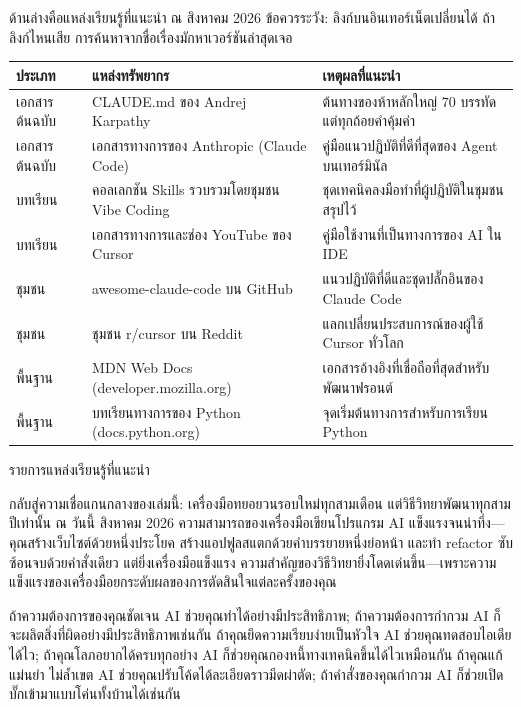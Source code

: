 
ด้านล่างคือแหล่งเรียนรู้ที่แนะนำ ณ สิงหาคม 2026 ข้อควรระวัง: ลิงก์บนอินเทอร์เน็ตเปลี่ยนได้ ถ้าลิงก์ไหนเสีย การค้นหาจากชื่อเรื่องมักหาเวอร์ชันล่าสุดเจอ

\begin{center}
\begin{tabularx}{\linewidth}{|X|X|X|}
\hline
\textbf{ประเภท} & \textbf{แหล่งทรัพยากร} & \textbf{เหตุผลที่แนะนำ} \tabularnewline
\hline
เอกสารต้นฉบับ & CLAUDE.md ของ Andrej Karpathy & ต้นทางของห้าหลักใหญ่ 70 บรรทัดแต่ทุกถ้อยคำคุ้มค่า \tabularnewline
เอกสารต้นฉบับ & เอกสารทางการของ Anthropic (Claude Code) & คู่มือแนวปฏิบัติที่ดีที่สุดของ Agent บนเทอร์มินัล \tabularnewline
บทเรียน & คอลเลกชัน Skills รวบรวมโดยชุมชน Vibe Coding & ชุดเทคนิคลงมือทำที่ผู้ปฏิบัติในชุมชนสรุปไว้ \tabularnewline
บทเรียน & เอกสารทางการและช่อง YouTube ของ Cursor & คู่มือใช้งานที่เป็นทางการของ AI ใน IDE \tabularnewline
ชุมชน & awesome-claude-code บน GitHub & แนวปฏิบัติที่ดีและชุดปลั๊กอินของ Claude Code \tabularnewline
ชุมชน & ชุมชน r/cursor บน Reddit & แลกเปลี่ยนประสบการณ์ของผู้ใช้ Cursor ทั่วโลก \tabularnewline
พื้นฐาน & MDN Web Docs (developer.mozilla.org) & เอกสารอ้างอิงที่เชื่อถือที่สุดสำหรับพัฒนาฟรอนต์ \tabularnewline
พื้นฐาน & บทเรียนทางการของ Python (docs.python.org) & จุดเริ่มต้นทางการสำหรับการเรียน Python \tabularnewline
\hline
\end{tabularx}
\end{center}

\begin{center}\small\color{gray}รายการแหล่งเรียนรู้ที่แนะนำ\end{center}


กลับสู่ความเชื่อแกนกลางของเล่มนี้: เครื่องมือทยอยวนรอบใหม่ทุกสามเดือน แต่วิธีวิทยาพัฒนาทุกสามปีเท่านั้น ณ วันนี้ สิงหาคม 2026 ความสามารถของเครื่องมือเขียนโปรแกรม AI แข็งแรงจนน่าทึ่ง—คุณสร้างเว็บไซต์ด้วยหนึ่งประโยค สร้างแอปฟูลสแตกด้วยคำบรรยายหนึ่งย่อหน้า และทำ refactor ซับซ้อนจบด้วยคำสั่งเดียว แต่ยิ่งเครื่องมือแข็งแรง ความสำคัญของวิธีวิทยายิ่งโดดเด่นขึ้น—เพราะความแข็งแรงของเครื่องมือยกระดับผลของการตัดสินใจแต่ละครั้งของคุณ

ถ้าความต้องการของคุณชัดเจน AI ช่วยคุณทำได้อย่างมีประสิทธิภาพ; ถ้าความต้องการกำกวม AI ก็จะผลิตสิ่งที่ผิดอย่างมีประสิทธิภาพเช่นกัน ถ้าคุณยึดความเรียบง่ายเป็นหัวใจ AI ช่วยคุณทดสอบไอเดียได้ไว; ถ้าคุณโลภอยากได้ครบทุกอย่าง AI ก็ช่วยคุณกองหนี้ทางเทคนิคขึ้นได้ไวเหมือนกัน ถ้าคุณแก้แม่นยำ ไม่ล้ำเขต AI ช่วยคุณปรับโค้ดได้ละเอียดราวมีดผ่าตัด; ถ้าคำสั่งของคุณกำกวม AI ก็ช่วยเปิดบั๊กเข้ามาแบบโค่นทั้งบ้านได้เช่นกัน


